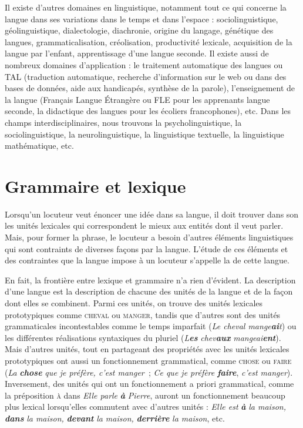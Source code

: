 {    Il existe d’autres domaines en linguistique, notamment tout ce qui concerne la langue dans ses variations dans le temps et dans l’espace : sociolinguistique, géolinguistique, dialectologie, diachronie, origine du langage, génétique des langues, grammaticalisation, créolisation, productivité lexicale, acquisition de la langue par l’enfant, apprentissage d’une langue seconde. Il existe aussi de nombreux domaines d’application : le traitement automatique des langues ou TAL (traduction automatique, recherche d’information sur le web ou dans des bases de données, aide aux handicapés, synthèse de la parole), l’enseignement de la langue (Français Langue Étrangère ou FLE pour les apprenants langue seconde, la didactique des langues pour les écoliers francophones), etc. Dans les champs interdisciplinaires, nous trouvons la psycholinguistique, la sociolinguistique, la neurolinguistique, la linguistique textuelle, la linguistique mathématique, etc.
}

\section{Grammaire et lexique}\label{sec:0.0.5}

Lorsqu’un locuteur veut énoncer une idée dans sa langue, il doit trouver dans son  les unités lexicales qui correspondent le mieux aux entités dont il veut parler. Mais, pour former la phrase, le locuteur a besoin d’autres éléments linguistiques qui sont contraints de diverses façons par la langue. L’étude de ces éléments et des contraintes que la langue impose à un locuteur s’appelle la  de cette langue.

En fait, la frontière entre lexique et grammaire n’a rien d’évident. La description d’une langue est la description de chacune des unités de la langue et de la façon dont elles se combinent. Parmi ces unités, on trouve des unités lexicales prototypiques comme \textsc{cheval} ou \textsc{manger}, tandis que d’autres sont des unités grammaticales incontestables comme le temps imparfait (\textit{Le cheval mange}\textbf{\textit{ai}}\textit{t}) ou les différentes réalisations syntaxiques du pluriel (\textit{L}\textbf{\textit{es}} \textit{chev}\textbf{\textit{aux}} \textit{mangeai}\textbf{\textit{ent}}). Mais d’autres unités, tout en partageant des propriétés avec les unités lexicales prototypiques ont aussi un fonctionnement grammatical, comme \textsc{chose} ou \textsc{faire} (\textit{La} \textbf{\textit{chose}} \textit{que je préfère, c’est manger~}; \textit{Ce que je préfère} \textbf{\textit{faire}}, \textit{c’est manger}). Inversement, des unités qui ont un fonctionnement a priori grammatical, comme la préposition \textsc{à} dans \textit{Elle parle} \textbf{\textit{à}} \textit{Pierre}, auront un fonctionnement beaucoup plus lexical lorsqu’elles commutent avec d’autres unités : \textit{Elle est} \textbf{\textit{à}} \textit{la maison,} \textbf{\textit{dans}} \textit{la maison,} \textbf{\textit{devant}} \textit{la maison,} \textbf{\textit{derrière}} \textit{la maison}, etc.

